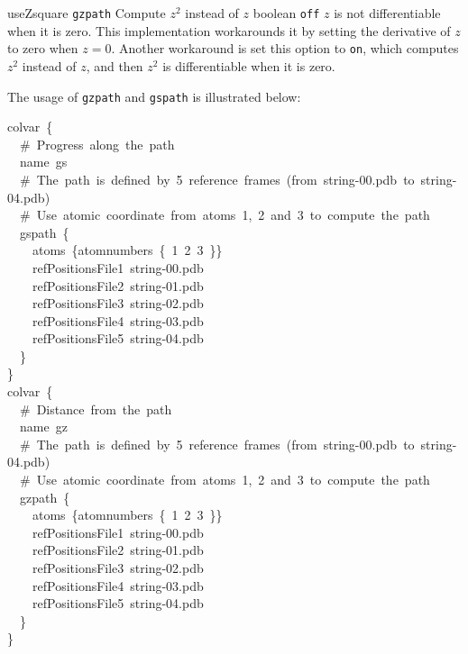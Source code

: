 
\begin{cvcoptions}

\item %
  \keydef
    {useZsquare}{%
    \texttt{gzpath}}{%
    Compute $z^2$ instead of $z$}{%
    boolean}{%
    \texttt{off}}{%
    $z$ is not differentiable when it is zero. This implementation workarounds it by setting the derivative of $z$ to zero when $z = 0$. Another workaround is set this option to \texttt{on}, which computes $z^2$ instead of $z$, and then $z^2$ is differentiable when it is zero.
  }

\end{cvcoptions}

The usage of \texttt{gzpath} and \texttt{gspath} is illustrated below:

\begin{cvexampleinput}
colvar~\{\\
\-~~\#~Progress~along~the~path\\
\-~~name~gs\\
\-~~\#~The~path~is~defined~by~5~reference~frames~(from~string-00.pdb~to~string-04.pdb)\\
\-~~\#~Use~atomic~coordinate~from~atoms~1,~2~and~3~to~compute~the~path\\
\-~~gspath~\{\\
\-~~~~atoms~\{atomnumbers~\{~1~2~3~\}\}\\
\-~~~~refPositionsFile1~string-00.pdb\\
\-~~~~refPositionsFile2~string-01.pdb\\
\-~~~~refPositionsFile3~string-02.pdb\\
\-~~~~refPositionsFile4~string-03.pdb\\
\-~~~~refPositionsFile5~string-04.pdb\\
\-~~\}\\
\}\\
\-colvar~\{\\
\-~~\#~Distance~from~the~path\\
\-~~name~gz\\
\-~~\#~The~path~is~defined~by~5~reference~frames~(from~string-00.pdb~to~string-04.pdb)\\
\-~~\#~Use~atomic~coordinate~from~atoms~1,~2~and~3~to~compute~the~path\\
\-~~gzpath~\{\\
\-~~~~atoms~\{atomnumbers~\{~1~2~3~\}\}\\
\-~~~~refPositionsFile1~string-00.pdb\\
\-~~~~refPositionsFile2~string-01.pdb\\
\-~~~~refPositionsFile3~string-02.pdb\\
\-~~~~refPositionsFile4~string-03.pdb\\
\-~~~~refPositionsFile5~string-04.pdb\\
\-~~\}\\
\}
\end{cvexampleinput}


